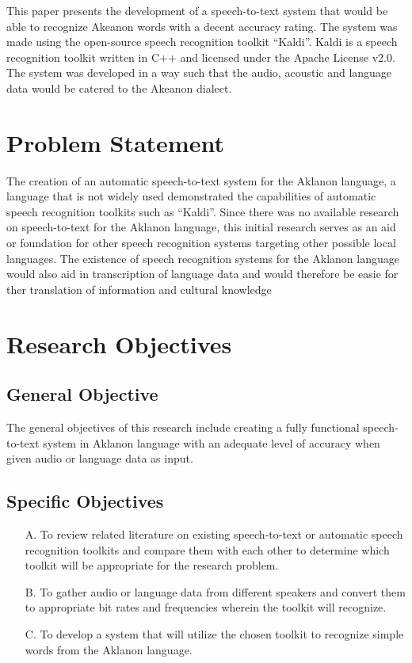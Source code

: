 This paper presents the development of a speech-to-text system that would be able to recognize Akeanon words with a decent accuracy rating. The system was made using the open-source speech recognition toolkit “Kaldi”. Kaldi is a speech recognition toolkit written in C++ and licensed under the Apache License v2.0. The system was developed in a way such that the audio, acoustic and language data would be catered to the Akeanon dialect.


\section{Problem Statement}

The creation of an automatic speech-to-text system for the Aklanon language, a language that is not widely used demonstrated the capabilities of automatic speech recognition toolkits such as “Kaldi”.  Since there was no available research on speech-to-text for the Aklanon language, this initial research serves as an aid or foundation for other speech recognition systems targeting other possible local languages. The existence of speech recognition systems for the Aklanon language would also aid in transcription of language data and would therefore be easie for ther translation of information and cultural knowledge

\section{Research Objectives}


\subsection{General Objective}

The general objectives of this research include creating a fully functional speech-to-text system in Aklanon language with an adequate level of accuracy when given audio or language data as input. 


\subsection{Specific Objectives}
\begin{itemize}
\item[A.] To review related literature on existing speech-to-text or automatic speech recognition toolkits and compare them with each other to determine which toolkit will be appropriate for the research problem. 

\item[B.] To gather audio or language data from different speakers and convert them to appropriate bit rates and frequencies wherein the toolkit will recognize. 

\item[C.] To develop a system that will utilize the chosen toolkit to recognize simple words from the Aklanon language.
\end{itemize}


